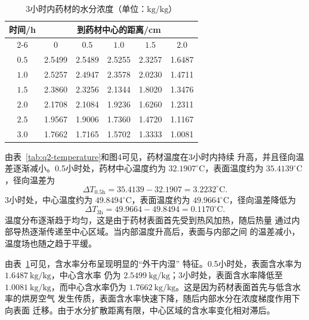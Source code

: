 \documentclass[12pt,a4paper]{article}
\begin{document}
\begin{center}
\begin{table}[H]
\centering
\caption{3小时内药材的水分浓度（单位：$\mathrm{kg/kg}$）}
\label{tab:q2-moisture}
\begin{tabular}{cccccc}
\toprule
\multirow{2}{*}{时间/h}
& \multicolumn{5}{c}{到药材中心的距离/cm}\\
\cmidrule(lr){2-6}
& $0$ & $0.5$ & $1.0$ & $1.5$ & $2.0$\\
\midrule
$0.5$ & 2.5499 & 2.5489 & 2.5255 & 2.3257 & 1.6487\\
$1.0$ & 2.5257 & 2.4947 & 2.3578 & 2.0230 & 1.4711\\
$1.5$ & 2.3860 & 2.3256 & 2.1344 & 1.8020 & 1.3476\\
$2.0$ & 2.1708 & 2.1084 & 1.9236 & 1.6260 & 1.2311\\
$2.5$ & 1.9567 & 1.9006 & 1.7360 & 1.4720 & 1.1167\\
$3.0$ & 1.7662 & 1.7165 & 1.5702 & 1.3333 & 1.0081\\
\bottomrule
\end{tabular}
\end{table}


由表~\ref{tab:q2-temperature}和图4可见，药材温度在3小时内持续
升高，并且径向温差逐渐减小。0.5小时处，药材中心温度约为
$32.1907^\circ\mathrm{C}$，表面温度约为
$35.4139^\circ\mathrm{C}$，径向温差为
\begin{equation}
\Delta T_{0.5\mathrm h}
=
35.4139-32.1907
=
3.2232^\circ\mathrm{C}.
\end{equation}
3小时处，中心温度约为 $49.8494^\circ\mathrm{C}$，表面温度约为
$49.9664^\circ\mathrm{C}$，径向温差降低为
\begin{equation}
\Delta T_{3\mathrm h}
=
49.9664-49.8494
=
0.1170^\circ\mathrm{C}.
\end{equation}
温度分布逐渐趋于均匀，这是由于药材表面首先受到热风加热，随后热量
通过内部导热逐渐传递至中心区域。当内部温度升高后，表面与内部之间
的温差减小，温度场也随之趋于平缓。

由表~\ref{tab:q2-moisture}可见，含水率分布呈现明显的“外干内湿”
特征。0.5小时处，表面含水率为 $1.6487\ \mathrm{kg/kg}$，中心含水率
仍为 $2.5499\ \mathrm{kg/kg}$；3小时处，表面含水率降低至
$1.0081\ \mathrm{kg/kg}$，而中心含水率仍为
$1.7662\ \mathrm{kg/kg}$。这是因为药材表面首先与低含水率的烘房空气
发生传质，表面含水率快速下降，随后内部水分在浓度梯度作用下向表面
迁移。由于水分扩散距离有限，中心区域的含水率变化相对滞后。


\end{center}
\end{document}
